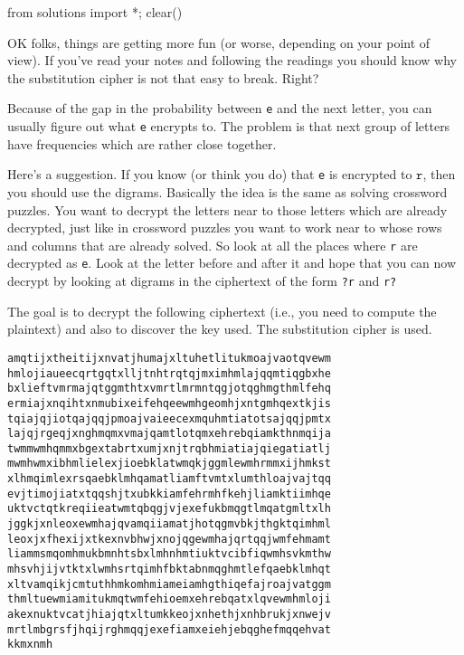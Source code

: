 \begin{python0}
from solutions import *; clear()
\end{python0}

OK folks, things are getting more fun (or worse, depending on your
point of view). If you've read your notes and following the readings
you should know why the substitution cipher is not that easy to
break. Right?

Because of the gap in the probability between \texttt{e} and the
next letter, you can usually figure out what \texttt{e} encrypts
to. The problem is that next group of letters have frequencies
which are rather close together.

Here's a suggestion. If you know (or think you do) that \texttt{e}
is encrypted to $\texttt{r}$, then you should use the digrams.
Basically the idea is the same as solving crossword puzzles. You
want to decrypt the letters near to those letters which are
already decrypted, just like in crossword puzzles you want to work
near to whose rows and columns that are already solved. So look at
all the places where \texttt{r} are decrypted as \texttt{e}. Look
at the letter before and after it and hope that you can now
decrypt by looking at digrams in the ciphertext of the form
\texttt{?r} and \texttt{r?}

\begin{eg}
The goal is to decrypt
the following ciphertext (i.e., you need to compute the plaintext) and also
to discover the key used.
The substitution cipher is used.
\begin{Verbatim}[frame=single,fontsize=\small]
amqtijxtheitijxnvatjhumajxltuhetlitukmoajvaotqvewm
hmlojiaueecqrtgqtxlljtnhtrqtqjmximhmlajqqmtiqgbxhe
bxlieftvmrmajqtggmthtxvmrtlmrmntqgjotqghmgthmlfehq
ermiajxnqihtxnmubixeifehqeewmhgeomhjxntgmhqextkjis
tqiajqjiotqajqqjpmoajvaieecexmquhmtiatotsajqqjpmtx
lajqjrgeqjxnghmqmxvmajqamtlotqmxehrebqiamkthnmqija
twmmwmhqmmxbgextabrtxumjxnjtrqbhmiatiajqiegatiatlj
mwmhwmxibhmlielexjioebklatwmqkjggmlewmhrmmxijhmkst
xlhmqimlexrsqaebklmhqamatliamftvmtxlumthloajvajtqq
evjtimojiatxtqqshjtxubkkiamfehrmhfkehjliamktiimhqe
uktvctqtkreqiieatwmtqbqgjvjexefukbmqgtlmqatgmltxlh
jggkjxnleoxewmhajqvamqiiamatjhotqgmvbkjthgktqimhml
leoxjxfhexijxtkexnvbhwjxnojqgewmhajqrtqqjwmfehmamt
liammsmqomhmukbmnhtsbxlmhnhmtiuktvcibfiqwmhsvkmthw
mhsvhjijvtktxlwmhsrtqimhfbktabnmqghmtlefqaebklmhqt
xltvamqikjcmtuthhmkomhmiameiamhgthiqefajroajvatggm
thmltuewmiamitukmqtwmfehioemxehrebqatxlqvewmhmloji
akexnuktvcatjhiajqtxltumkkeojxnhethjxnhbrukjxnwejv
mrtlmbgrsfjhqijrghmqqjexefiamxeiehjebqghefmqqehvat
kkmxnmh
\end{Verbatim}
\end{eg}

